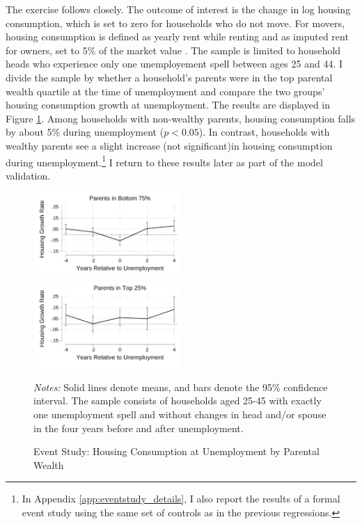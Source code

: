 \documentclass[12pt]{article}
\begin{document}
The exercise follows \cite{Chetty2007} closely. The outcome of interest is the change in log housing consumption, which is set to zero for households who do not move. For movers, housing consumption is defined as yearly rent while renting and as imputed rent for owners, set to 5\% of the market value \citep{Davis2008}. The sample is limited to household heads who experience only one unemployement spell between ages 25 and 44. I divide the sample by whether a household's parents were in the top parental wealth quartile at the time of unemployment and compare the two groups' housing consumption growth at unemployment. The results are displayed in Figure \ref{fig:housinggrowthrates}. Among households with non-wealthy parents, housing consumption falls by about 5\% during unemployment ($p<0.05$). In contrast, households with wealthy parents see a slight increase (not significant)in housing consumption during unemployment.\footnote{In Appendix \ref{app:eventstudy_details}, I also report the results of a formal event study using the same set of controls as in the previous regressions.}  I return to these results later as part of the model validation.

\begin{figure}
	\caption{Event Study: Housing Consumption at Unemployment by Parental Wealth}\label{fig:housinggrowthrates}
	\noindent%
	\includegraphics[width=0.5\textwidth]{../tabfig/descr/PSID_housinggrowthpoor_both}%
	\includegraphics[width=0.5\textwidth]{../tabfig/descr/PSID_housinggrowthrich_both}

	{\begin{footnotesize} \textit{Notes:} Solid lines denote means, and bars denote the 95\% confidence interval. The sample consists of households aged 25-45 with exactly one unemployment spell and without changes in head and/or spouse in the four years before and after unemployment. \end{footnotesize}}
\end{figure}
\end{document}
